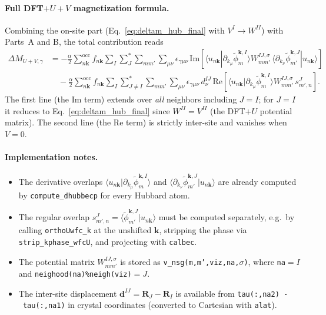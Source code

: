\documentclass[11pt]{article}
\begin{document}
\paragraph{Full DFT$+U+V$ magnetization formula.}
Combining the on-site part (Eq.~\eqref{eq:deltam_hub_final} with
$V^I\to W^{II}$) with Parts~A and B, the total contribution reads
\begin{align}
  \Delta M_{U+V,\gamma}
  &=
  -\frac{\alpha}{2}
  \sum_{n\mathbf{k}}^{\mathrm{occ}}f_{n\mathbf{k}}
  \sum_{I}\sum_{J}^{*}\sum_{mm'}\sum_{\mu\nu}
  \epsilon_{\gamma\mu\nu}\,
  \mathrm{Im}\!\left[
    \langle u_{n\mathbf{k}}|\partial_{k_\mu}\widetilde\phi^{\mathbf{k},I}_{m}\rangle
    W_{mm'}^{IJ,\sigma}\,
    \langle\partial_{k_\nu}\widetilde\phi^{\mathbf{k},J}_{m'}|u_{n\mathbf{k}}\rangle
  \right]
  \nonumber\\
  &\quad
  -\frac{\alpha}{2}
  \sum_{n\mathbf{k}}^{\mathrm{occ}}f_{n\mathbf{k}}
  \sum_{I}\sum_{J\ne I}^{*}\sum_{mm'}\sum_{\mu\nu}
  \epsilon_{\gamma\mu\nu}\,d^{IJ}_\nu\,
  \mathrm{Re}\!\left[
    \langle u_{n\mathbf{k}}|\partial_{k_\mu}\widetilde\phi^{\mathbf{k},I}_{m}\rangle
    W_{mm'}^{IJ,\sigma}\,
    s^{J}_{m',n}
  \right].
  \label{eq:deltam_uv_final}
\end{align}
The first line (the Im term) extends over \emph{all} neighbors including
$J=I$; for $J=I$ it reduces to Eq.~\eqref{eq:deltam_hub_final} since
$W^{II}=V^{II}$ (the DFT$+U$ potential matrix).  The second line
(the Re term) is strictly inter-site and vanishes when $V=0$.

\paragraph{Implementation notes.}
\begin{itemize}
  \item The derivative overlaps
    $\langle u_{n\mathbf{k}}|\partial_{k_\mu}\widetilde\phi^{\mathbf{k},I}_{m}\rangle$
    and
    $\langle\partial_{k_\nu}\widetilde\phi^{\mathbf{k},J}_{m'}|u_{n\mathbf{k}}\rangle$
    are already computed by \texttt{compute\_dhubbecp} for every Hubbard
    atom.

  \item The regular overlap $s^J_{m',n}=\langle\widetilde\phi^{\mathbf{k},J}_{m'}|u_{n\mathbf{k}}\rangle$
    must be computed separately, e.g.\ by calling \texttt{orthoUwfc\_k}
    at the unshifted $\mathbf{k}$, stripping the phase via
    \texttt{strip\_kphase\_wfcU}, and projecting with \texttt{calbec}.

  \item The potential matrix $W_{mm'}^{IJ,\sigma}$ is stored as
    \texttt{v\_nsg(m,m',viz,na,$\sigma$)}, where \texttt{na}$=I$ and
    \texttt{neighood(na)\%neigh(viz)}$=J$.

  \item The inter-site displacement $\mathbf{d}^{IJ}=\mathbf{R}_J-\mathbf{R}_I$
    is available from \texttt{tau(:,na2)~-~tau(:,na1)} in crystal
    coordinates (converted to Cartesian with \texttt{alat}).
\end{itemize}
\end{document}
